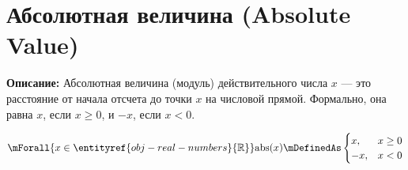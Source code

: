 
\section{Абсолютная величина (Absolute Value)}
\label{entity:op-abs-abstract}

\textbf{Описание:}
Абсолютная величина (модуль) действительного числа $x$ — это расстояние от начала отсчета до точки $x$ на числовой прямой. Формально, она равна $x$, если $x \geq 0$, и $-x$, если $x < 0$.

\hypertarget{op-abs-abstract}{}
\hypertarget{op-abs-abstract}{}
\begin{operation}
\[
\mForall{x \in \entityref{obj-real-numbers}{\mathbb{R}}}
\mathrm{abs}(x) \mDefinedAs
\begin{cases}
x, & x \geq 0 \\
-x, & x < 0
\end{cases}
\]
\end{operation}